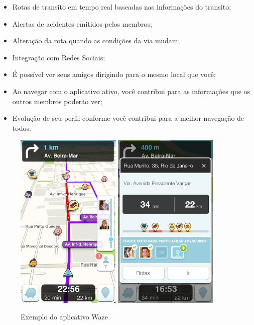 \begin{itemize}
\item Rotas de transito em tempo real baseadas nas informações do transito;
\item Alertas de acidentes emitidos pelos membros;
\item Alteração da rota quando as condições da via mudam;
\item Integração com Redes Sociais;
\item É possível ver seus amigos dirigindo para o mesmo local que você;
\item Ao navegar com o aplicativo ativo, você contribui para as informações que os outros membros poderão ver;
\item Evolução de seu perfil conforme você contribui para a melhor navegação de todos.
\end{itemize}

\begin{figure}[htp]
\begin{center}
  \includegraphics[width=5cm]{images/waze1.jpg}
    \includegraphics[width=5cm]{images/waze2.jpg}
  \caption{Exemplo do aplicativo Waze}
  \label{fig:exampleWaze}
\end{center}
\end{figure}

